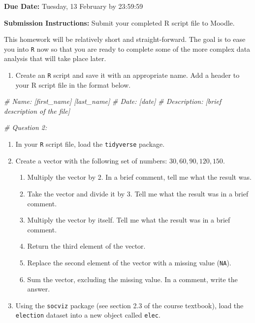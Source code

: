 \documentclass[
]{book}
\newenvironment{Shaded}{\begin{snugshade}}{\end{snugshade}}
\newcommand{\CommentTok}[1]{\textcolor[rgb]{0.56,0.35,0.01}{\textit{#1}}}
\providecommand{\tightlist}{%
  \setlength{\itemsep}{0pt}\setlength{\parskip}{0pt}}
\begin{document}
\textbf{Due Date:} Tuesday, 13 February by 23:59:59

\textbf{Submission Instructions:} Submit your completed R script file to Moodle.

This homework will be relatively short and straight-forward. The goal is to ease you into \texttt{R} now so that you are ready to complete some of the more complex data analysis that will take place later.

\begin{enumerate}
\def\labelenumi{\arabic{enumi}.}
\tightlist
\item
  Create an \texttt{R} script and save it with an appropriate name. Add a header to your R script file in the format below.
\end{enumerate}

\begin{Shaded}
\begin{Highlighting}[]
\CommentTok{\# Name: [first\_name] [last\_name]}
\CommentTok{\# Date: [date]}
\CommentTok{\# Description: [brief description of the file] }

\CommentTok{\# Question 2:}
\end{Highlighting}
\end{Shaded}

\begin{enumerate}
\def\labelenumi{\arabic{enumi}.}
\setcounter{enumi}{1}
\item
  In your \texttt{R} script file, load the \texttt{tidyverse} package.
\item
  Create a vector with the following set of numbers: \({30, 60, 90, 120, 150}\).

  \begin{enumerate}
  \def\labelenumii{\alph{enumii}.}
  \item
    Multiply the vector by 2. In a brief comment, tell me what the result was.
  \item
    Take the vector and divide it by 3. Tell me what the result was in a brief comment.
  \item
    Multiply the vector by itself. Tell me what the result was in a brief comment.
  \item
    Return the third element of the vector.
  \item
    Replace the second element of the vector with a missing value (\texttt{NA}).
  \item
    Sum the vector, excluding the missing value. In a comment, write the answer.
  \end{enumerate}
\item
  Using the \texttt{socviz} package (see section 2.3 of the course textbook), load the \texttt{election} dataset into a new object called \texttt{elec}.
\end{enumerate}
\end{document}
